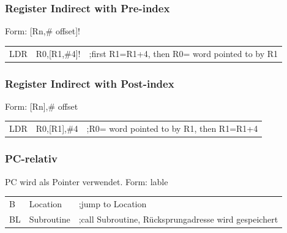 \subsubsection{Register Indirect with Pre-index}
Form: [Rn,\# offset]!\newline
\begin{tabular}{lll}
   LDR & R0,[R1,\#4]! &;first R1=R1+4, then R0= word pointed to by R1  \\ 
\end{tabular} 

\subsubsection{Register Indirect with Post-index}
Form: [Rn],\# offset\newline
\begin{tabular}{lll}
    LDR& R0,[R1],\#4  &;R0= word pointed to by R1, then R1=R1+4  \\ 
\end{tabular} 

\subsubsection{PC-relativ}
PC wird als Pointer verwendet.
Form: lable\newline
\begin{tabular}{lll}
    B   &Location   &;jump to Location\\ 
    BL  &Subroutine &;call Subroutine, Rücksprungadresse wird gespeichert\\ 
\end{tabular} 
\clearpage

